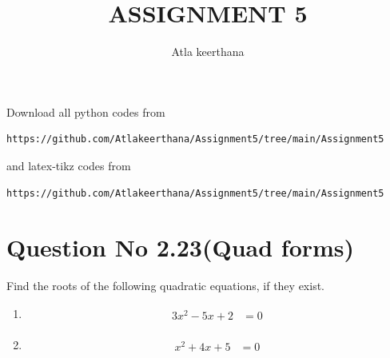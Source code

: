 \documentclass[journal,12pt,twocolumn]{IEEEtran}
\begin{document}
     \def\rightbox#1{\makebox[0in][r]{#1}}
     \def\centbox#1{\makebox[0in]{#1}}
     \def\topbox#1{\raisebox{-\baselineskip}[0in][0in]{#1}}
     \def\midbox#1{\raisebox{-0.5\baselineskip}[0in][0in]{#1}}
\vspace{3cm}
\title{ASSIGNMENT 5}
\author{Atla keerthana}
\maketitle
\newpage
\bigskip
\renewcommand{\thefigure}{\theenumi}
\renewcommand{\thetable}{\theenumi}
Download all python codes from 
\begin{lstlisting}
https://github.com/Atlakeerthana/Assignment5/tree/main/Assignment5
\end{lstlisting}
%
and latex-tikz codes from 
%
\begin{lstlisting}
https://github.com/Atlakeerthana/Assignment5/tree/main/Assignment5
\end{lstlisting}
%
\section{Question No 2.23(Quad forms)}
Find the roots of the following quadratic equations, if they exist.
%
\begin{enumerate}
\item
\begin{align}
\begin{split}
3x^2-5x+2&=0 \label{1.0.1}
\end{split}
\end{align}
\item
\begin{align}
\begin{split}
x^2+4x+5&=0 \label{1.0.2}
\end{split}
\end{align}
\end{enumerate}
%
\end{document}
